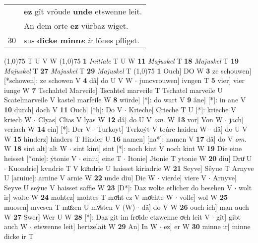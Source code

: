 \documentclass[8pt,a4paper,notitlepage]{article}
\begin{document}
\begin{table}[ht]
\begin{minipage}[t]{0.5\linewidth}
\begin{tabular}{rl}
 & \textbf{ez} gît vröude \textbf{unde} etswenne leit.\\ 
 & An dem orte \textbf{ez} vürbaz wiget.\\ 
30 & sus \textbf{dicke minn\textit{e}} \textit{i}r lônes pfliget.\\ 
\end{tabular}
\scriptsize
\line(1,0){75} \newline
T U V W \newline
\line(1,0){75} \newline
\textbf{1} \textit{Initiale} T U W  \textbf{11} \textit{Majuskel} T  \textbf{18} \textit{Majuskel} T  \textbf{19} \textit{Majuskel} T  \textbf{27} \textit{Majuskel} T  \textbf{29} \textit{Majuskel} T  \newline
\line(1,0){75} \newline
\textbf{1} Ouch] DO W \textbf{3} ze schouwen] [*schowen]: ze schowen V \textbf{4} dâ] do U V W  $\cdot$ juncvrouwen] ivngen T \textbf{5} vier] vier iunge W \textbf{7} Tschahtel Marveile] Tscahtel marveile T Tschatel marveile U Scatelmarveile V kastel marfeile W \textbf{8} würde] [*]: do wart V \textbf{9} âne] [*]: in ane V \textbf{10} durch] doch V \textbf{11} Ouch] [*h]: Do V  $\cdot$ Krieche] Crieche T U [*]: krieche V kriech W  $\cdot$ Clyas] Clias V lyas W \textbf{12} dâ] do U V \textit{om.} W \textbf{13} vor] Von W  $\cdot$ jach] veriach W \textbf{14} ein] [*]: Der V  $\cdot$ Turkoyt] Tvrkoẏt V teúre haiden W  $\cdot$ dâ] do U V W \textbf{15} hinderz] hinders T Hinder U \textbf{16} namen] [na*]: namen V \textbf{17} dâ] do V \textit{om.} W \textbf{18} sint alt] alt W  $\cdot$ sint kint] sint [*]: noch kint V noch kint W \textbf{19} Die eine heisset [*onie]: ẏtonie V  $\cdot$ einiu] eine T  $\cdot$ Itonie] Jtonie T ytonie W \textbf{20} diu] Druͦ U  $\cdot$ Kuondrie] kvndrie T V kuͦndrie U haisset kiriadrie W \textbf{21} Seyve] Sêyue T Arnyve U [aruiue]: arnine V arnie W \textbf{22} unde diu] Die W  $\cdot$ vierde] viere V  $\cdot$ Arnyve] Seyve U seẏue V haisset saffie W \textbf{23} [D*]: Daz wolte etlicher do besehen V  $\cdot$ wolt ir] wolte W \textbf{24} mohtez] mohtes T moͤht ez V moͤchte W  $\cdot$ volle] wol W \textbf{25} muosen] mvesen T muͦzen U mvͤsten V (W)  $\cdot$ dâ] do V W \textbf{26} ouch ich] man auch W \textbf{27} Swer] Wer U W \textbf{28} [*]: Daz git im froͤide etzwenne oͮch leit V  $\cdot$ gît] gibt auch W  $\cdot$ etswenne leit] hertzelait W \textbf{29} An] In W  $\cdot$ ez] er W \textbf{30} minne ir] minne dicke ir T \newline
\end{minipage}
\end{table}
\end{document}

